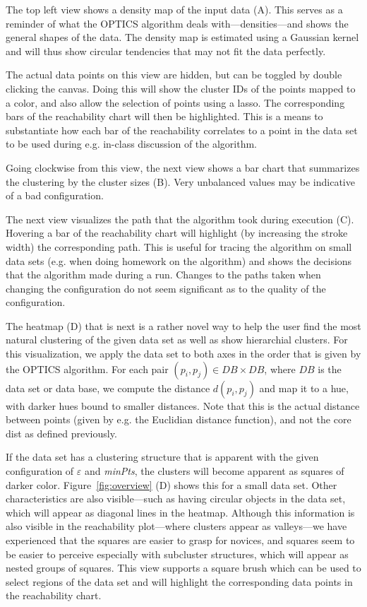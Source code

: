\documentclass{vgtc} %
\begin{document}
The top left view shows a density map of the input data (A). This serves as a reminder
of what the OPTICS algorithm deals with---densities---and shows the general shapes of
the data. The density map is estimated using a Gaussian kernel and will thus show
circular tendencies that may not fit the data perfectly.

The actual data points on this view are hidden, but can be toggled by double clicking
the canvas. Doing this will show the cluster IDs of the points mapped to a color, and
also allow the selection of points using a lasso. The corresponding bars of the reachability
chart will then be highlighted. This is a means to substantiate how each bar of the
reachability correlates to a point in the data set to be used during e.g. in-class
discussion of the algorithm.

Going clockwise from this view, the next view shows a bar chart that summarizes the
clustering by the cluster sizes (B). Very unbalanced values may be indicative of a bad
configuration.

The next view visualizes the path that the algorithm took during execution (C).
Hovering a bar of the reachability chart will highlight (by increasing the
stroke width) the corresponding path. This is useful for tracing the algorithm
on small data sets (e.g. when doing homework on the algorithm) and shows the
decisions that the algorithm made during a run. Changes to the paths taken when
changing the configuration do not seem significant as to the quality of the
configuration.

The heatmap (D) that is next is a rather novel way to help the user find the most
natural clustering of the given data set as well as show hierarchial clusters.
For this visualization, we apply the data set to both axes in the order that is
given by the OPTICS algorithm. For each pair $(p_i, p_j) \in DB \times
DB$, where $DB$ is the data set or data base, we compute the distance
$d(p_i, p_j)$ and map it to a hue, with darker hues bound to smaller distances.
Note that this is the actual distance between points (given by e.g. the
Euclidian distance function), and not the core dist as defined previously.

If the data set has a clustering structure that is apparent with the given
configuration of $\varepsilon$ and \emph{minPts}, the clusters will become
apparent as squares of darker color. Figure~\ref{fig:overview} (D) shows this for a
small data set. Other characteristics are also visible---such as having
circular objects in the data set, which will appear as diagonal lines in the
heatmap. Although this information is also visible in the reachability
plot---where clusters appear as valleys---we have experienced that the squares
are easier to grasp for novices, and squares seem to be easier to perceive
especially with subcluster structures, which will appear as nested groups of
squares. This view supports a square brush which can be used to select regions
of the data set and will highlight the corresponding data points in the
reachability chart.
\end{document}
